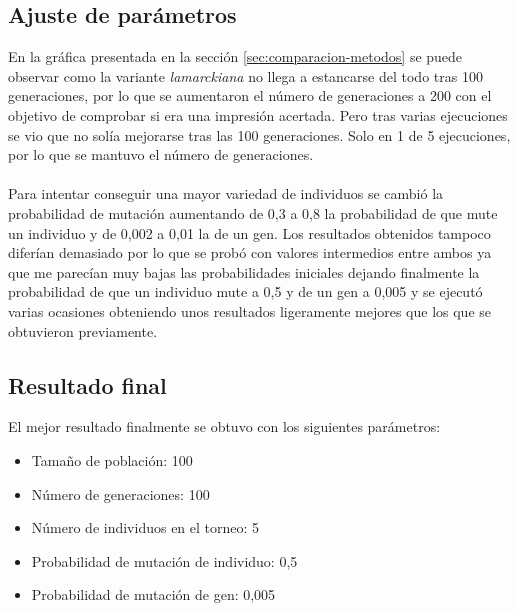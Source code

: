 \subsection{Ajuste de parámetros}

En la gráfica presentada en la sección \ref{sec:comparacion-metodos} se puede observar como la variante \textit{lamarckiana} no llega a estancarse del todo tras 100 generaciones, por lo que se aumentaron el número de generaciones a 200 con el objetivo de comprobar si era una impresión acertada. Pero tras varias ejecuciones se vio que no solía mejorarse tras las 100 generaciones. Solo en 1 de 5 ejecuciones, por lo que se mantuvo el número de generaciones.
\\ \\
Para intentar conseguir una mayor variedad de individuos se cambió la probabilidad de mutación aumentando de 0,3 a 0,8 la probabilidad de que mute un individuo y de 0,002 a 0,01 la de un gen. Los resultados obtenidos tampoco diferían demasiado por lo que se probó con valores intermedios entre ambos ya que me parecían muy bajas las probabilidades iniciales dejando finalmente la probabilidad de que un individuo mute a 0,5 y de un gen a 0,005 y se ejecutó varias ocasiones obteniendo unos resultados ligeramente mejores que los que se obtuvieron previamente.

\subsection{Resultado final}

El mejor resultado finalmente se obtuvo con los siguientes parámetros:

\begin{itemize}
	\item Tamaño de población: 100
	\item Número de generaciones: 100
	\item Número de individuos en el torneo: 5
	\item Probabilidad de mutación de individuo: 0,5
	\item Probabilidad de mutación de gen: 0,005
\end{itemize}

